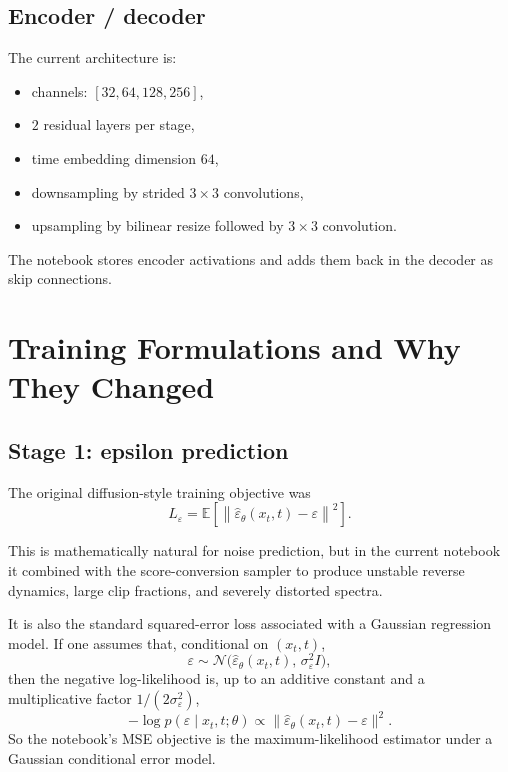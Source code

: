 \documentclass[11pt]{article}
\newcommand{\EE}{\mathbb{E}}
\newcommand{\e}{\varepsilon}
\begin{document}
\subsection{Encoder / decoder}

The current architecture is:
\begin{itemize}[leftmargin=1.5em]
  \item channels: \([32, 64, 128, 256]\),
  \item \(2\) residual layers per stage,
  \item time embedding dimension \(64\),
  \item downsampling by strided \(3\times 3\) convolutions,
  \item upsampling by bilinear resize followed by \(3\times 3\) convolution.
\end{itemize}

The notebook stores encoder activations and adds them back in the decoder as skip connections.

\section{Training Formulations and Why They Changed}

\subsection{Stage 1: epsilon prediction}

The original diffusion-style training objective was
\begin{equation}
  L_\e
  =
  \EE \left[
    \left\|
      \hat\e_\theta(x_t,t)-\e
    \right\|^2
  \right].
\end{equation}

This is mathematically natural for noise prediction, but in the current notebook it combined with the score-conversion sampler to produce unstable reverse dynamics, large clip fractions, and severely distorted spectra.

It is also the standard squared-error loss associated with a Gaussian regression model. If one assumes that, conditional on \((x_t,t)\),
\begin{equation}
  \e \sim \mathcal N\bigl(\hat\e_\theta(x_t,t),\,\sigma_\e^2 I\bigr),
\end{equation}
then the negative log-likelihood is, up to an additive constant and a multiplicative factor \(1/(2\sigma_\e^2)\),
\begin{equation}
  -\log p(\e\mid x_t,t;\theta)
  \propto
  \|\hat\e_\theta(x_t,t)-\e\|^2.
\end{equation}
So the notebook's MSE objective is the maximum-likelihood estimator under a Gaussian conditional error model.
\end{document}
